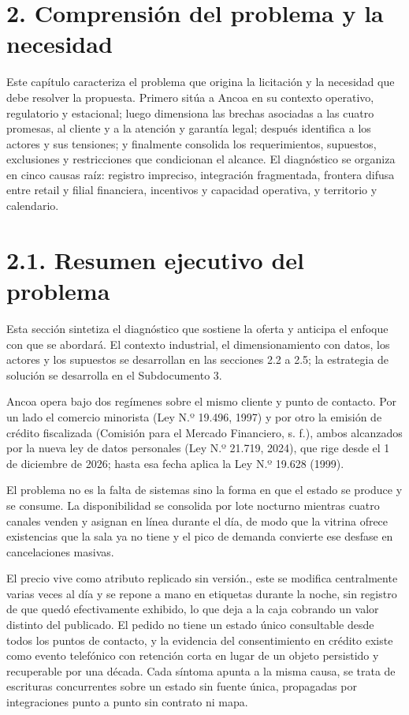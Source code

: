 \documentclass[11pt]{article}
\begin{document}
\section{2. Comprensión del problema y la necesidad}\label{comprension-del-problema-y-la-necesidad}

Este capítulo caracteriza el problema que origina la licitación y la necesidad que debe resolver la propuesta. Primero sitúa a Ancoa en su contexto operativo, regulatorio y estacional; luego dimensiona las brechas asociadas a las cuatro promesas, al cliente y a la atención y garantía legal; después identifica a los actores y sus tensiones; y finalmente consolida los requerimientos, supuestos, exclusiones y restricciones que condicionan el alcance. El diagnóstico se organiza en cinco causas raíz: registro impreciso, integración fragmentada, frontera difusa entre retail y filial financiera, incentivos y capacidad operativa, y territorio y calendario.

\section{2.1. Resumen ejecutivo del problema}\label{resumen-ejecutivo-del-problema}

Esta sección sintetiza el diagnóstico que sostiene la oferta y anticipa el enfoque con que se abordará. El contexto industrial, el dimensionamiento con datos, los actores y los supuestos se desarrollan en las secciones 2.2 a 2.5; la estrategia de solución se desarrolla en el Subdocumento 3.

Ancoa opera bajo dos regímenes sobre el mismo cliente y punto de contacto. Por un lado el comercio minorista (Ley N.º 19.496, 1997) y por otro la emisión de crédito fiscalizada (Comisión para el Mercado Financiero, s. f.), ambos alcanzados por la nueva ley de datos personales (Ley N.º 21.719, 2024), que rige desde el 1 de diciembre de 2026; hasta esa fecha aplica la Ley N.º 19.628 (1999).

El problema no es la falta de sistemas sino la forma en que el estado se produce y se consume. La disponibilidad se consolida por lote nocturno mientras cuatro canales venden y asignan en línea durante el día, de modo que la vitrina ofrece existencias que la sala ya no tiene y el pico de demanda convierte ese desfase en cancelaciones masivas.

El precio vive como atributo replicado sin versión., este se modifica centralmente varias veces al día y se repone a mano en etiquetas durante la noche, sin registro de que quedó efectivamente exhibido, lo que deja a la caja cobrando un valor distinto del publicado. El pedido no tiene un estado único consultable desde todos los puntos de contacto, y la evidencia del consentimiento en crédito existe como evento telefónico con retención corta en lugar de un objeto persistido y recuperable por una década. Cada síntoma apunta a la misma causa, se trata de escrituras concurrentes sobre un estado sin fuente única, propagadas por integraciones punto a punto sin contrato ni mapa.
\end{document}

